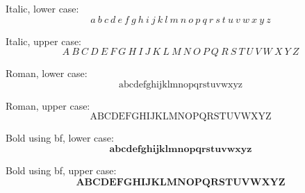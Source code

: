 \documentclass[12pt,a4paper,onecolumn]{article}
\begin{document}
Italic, lower case:
\begin{equation}
\mathit{a}~\mathit{b}~\mathit{c}~\mathit{d}~\mathit{e}~\mathit{f}~\mathit{g}~\mathit{h}~\mathit{i}~\mathit{j}~\mathit{k}~\mathit{l}~\mathit{m}~\mathit{n}~\mathit{o}~\mathit{p}~\mathit{q}~\mathit{r}~\mathit{s}~\mathit{t}~\mathit{u}~\mathit{v}~\mathit{w}~\mathit{x}~\mathit{y}~\mathit{z}
\end{equation}

Italic, upper case:
\begin{equation}
\mathit{A}~\mathit{B}~\mathit{C}~\mathit{D}~\mathit{E}~\mathit{F}~\mathit{G}~\mathit{H}~\mathit{I}~\mathit{J}~\mathit{K}~\mathit{L}~\mathit{M}~\mathit{N}~\mathit{O}~\mathit{P}~\mathit{Q}~\mathit{R}~\mathit{S}~\mathit{T}~\mathit{U}~\mathit{V}~\mathit{W}~\mathit{X}~\mathit{Y}~\mathit{Z}
\end{equation}

Roman, lower case:
\begin{equation}
\mathrm{a}  \mathrm{b}  \mathrm{c}  \mathrm{d}  \mathrm{e}  \mathrm{f}  \mathrm{g}  \mathrm{h}  \mathrm{i}  \mathrm{j}  \mathrm{k}  \mathrm{l}  \mathrm{m}  \mathrm{n}  \mathrm{o}  \mathrm{p}  \mathrm{q}  \mathrm{r}  \mathrm{s}  \mathrm{t}  \mathrm{u}  \mathrm{v}  \mathrm{w}  \mathrm{x}  \mathrm{y}  \mathrm{z}
\end{equation}

Roman, upper case:
\begin{equation}
\mathrm{A}  \mathrm{B}  \mathrm{C}  \mathrm{D}  \mathrm{E}  \mathrm{F}  \mathrm{G}  \mathrm{H}  \mathrm{I}  \mathrm{J}  \mathrm{K}  \mathrm{L}  \mathrm{M}  \mathrm{N}  \mathrm{O}  \mathrm{P}  \mathrm{Q}  \mathrm{R}  \mathrm{S}  \mathrm{T}  \mathrm{U}  \mathrm{V}  \mathrm{W}  \mathrm{X}  \mathrm{Y}  \mathrm{Z}
\end{equation}

Bold using bf, lower case:
\begin{equation}
\mathbf{a}  \mathbf{b}  \mathbf{c}  \mathbf{d}  \mathbf{e}  \mathbf{f}  \mathbf{g}  \mathbf{h}  \mathbf{i}  \mathbf{j}  \mathbf{k}  \mathbf{l}  \mathbf{m}  \mathbf{n}  \mathbf{o}  \mathbf{p}  \mathbf{q}  \mathbf{r}  \mathbf{s}  \mathbf{t}  \mathbf{u}  \mathbf{v}  \mathbf{w}  \mathbf{x}  \mathbf{y}  \mathbf{z}
\end{equation}

Bold using bf, upper case:
\begin{equation}
\mathbf{A}  \mathbf{B}  \mathbf{C}  \mathbf{D}  \mathbf{E}  \mathbf{F}  \mathbf{G}  \mathbf{H}  \mathbf{I}  \mathbf{J}  \mathbf{K}  \mathbf{L}  \mathbf{M}  \mathbf{N}  \mathbf{O}  \mathbf{P}  \mathbf{Q}  \mathbf{R}  \mathbf{S}  \mathbf{T}  \mathbf{U}  \mathbf{V}  \mathbf{W}  \mathbf{X}  \mathbf{Y}  \mathbf{Z}
\end{equation}
\end{document}
